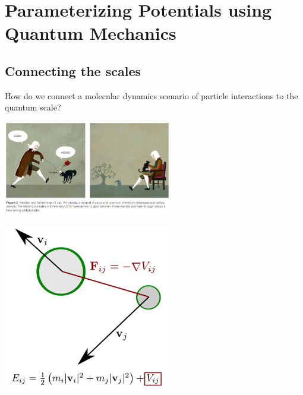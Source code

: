 \documentclass[
paper=128mm:96mm, %
fontsize=11pt, %
pagesize, %
parskip=half-, %
]{scrartcl} %
\theoremstyle{mythmstyle} %
\begin{document}
\clearpage


\section{Parameterizing Potentials using Quantum Mechanics}


\clearpage


\subsection{Connecting the scales}

How do we connect a molecular dynamics scenario of particle interactions to the quantum scale?

\clearpage


\begin{center}
\includegraphics[width=0.55\textwidth]{newtonSchrodinger}
\end{center}

\clearpage



\begin{center}
\includegraphics[width=0.55\textwidth]{moleculesColliding.pdf}
\end{center}
\end{document}
